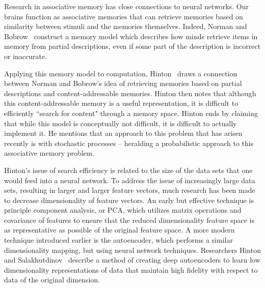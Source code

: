 \documentclass{sig-alternate}
\begin{document}
Research in associative memory has close connections to neural networks. Our brains function as 
associative memories that can retrieve memories based on similarity between stimuli and the memories 
themselves.  Indeed, Norman and Bobrow~\cite{bobrow} construct a memory model which describes how 
minds retrieve items in memory from partial descriptions, even if some part of the description is 
incorrect or inaccurate. 

Applying this memory model to computation, Hinton~\cite{hinton} draws a connection between Norman 
and Bobrow's idea of retrieving memories based on partial descriptions and content-addressable 
memories.  Hinton then notes that although this content-addressable memory is a useful 
representation, it is difficult to efficiently ``search for content" through a memory space. 
Hinton ends by claiming that while this model is conceptually not difficult, it is difficult to 
actually implement it. He mentions that an approach to this problem that has arisen recently is with 
stochastic processes -- heralding a probabilistic approach to this associative memory problem.

Hinton's issue of search efficiency is related to the size of the data sets that
one would feed into a neural network.  To address the issue of increasingly large data sets, 
resulting in larger and larger feature vectors, much research has been made to decrease 
dimensionality of feature vectors. An early but effective technique is principle component
analysis, or PCA, which utilizes matrix operations and covariance of features to ensure
that the reduced dimensionality feature space is as representative as possible of the original
feature space. A more modern technique introduced earlier is the autoencoder, which performs a
similar dimensionality mapping, but using neural network techniques. Researchers Hinton 
and Salakhutdinov~\cite{autoencoder} describe a method of creating deep autoencoders to learn low 
dimensionality representations of data that maintain high fidelity with respect to data of the original dimension.
\end{document}
